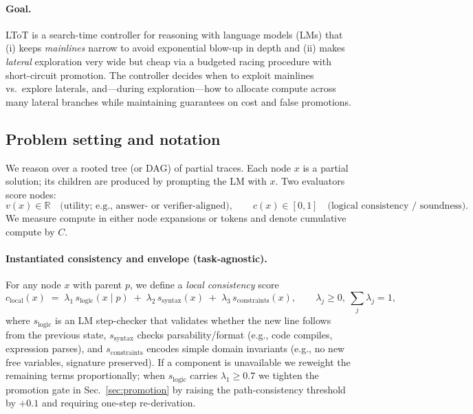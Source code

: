 \documentclass{article}
\begin{document}
\paragraph{Goal.}
LToT is a search-time controller for reasoning with language models (LMs) that
(i) keeps \emph{mainlines} narrow to avoid exponential blow-up in depth and
(ii) makes \emph{lateral} exploration very wide but cheap via a budgeted racing procedure with short-circuit promotion.
The controller decides when to exploit mainlines vs.\ explore laterals, and—during exploration—how to allocate compute across many lateral branches while maintaining guarantees on cost and false promotions.

\vspace{0.5em}
\subsection{Problem setting and notation}

We reason over a rooted tree (or DAG) of partial traces.
Each node $x$ is a partial solution; its children are produced by prompting the LM with $x$.
Two evaluators score nodes:
\[
v(x) \in \mathbb{R} \quad \text{(utility; e.g., answer- or verifier-aligned)}, \qquad
c(x) \in [0,1] \quad \text{(logical consistency / soundness)}.
\]
We measure compute in either node expansions or tokens and denote cumulative compute by $C$.


\paragraph{Instantiated consistency and envelope (task-agnostic).}
For any node $x$ with parent $p$, we define a \emph{local consistency} score
\begin{equation}
c_{\text{local}}(x)\;=\;\lambda_1\,s_{\text{logic}}(x\mid p)\;+\;\lambda_2\,s_{\text{syntax}}(x)\;+\;\lambda_3\,s_{\text{constraints}}(x),
\qquad \lambda_j\!\ge 0,\ \sum_j \lambda_j=1,
\end{equation}
where $s_{\text{logic}}$ is an LM step-checker that validates whether the new line follows from the previous state,
$s_{\text{syntax}}$ checks parsability/format (e.g., code compiles, expression parses), and
$s_{\text{constraints}}$ encodes simple domain invariants (e.g., no new free variables, signature preserved).
If a component is unavailable we reweight the remaining terms proportionally; when $s_{\text{logic}}$ carries $\lambda_1\ge 0.7$ we tighten the promotion gate in Sec.~\ref{sec:promotion} by raising the path-consistency threshold by $+0.1$ and requiring one-step re-derivation.
\end{document}
